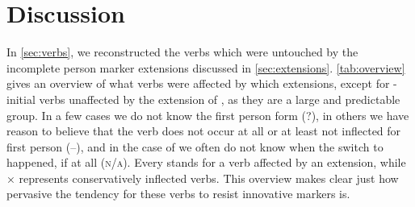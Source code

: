 \section{Discussion}
\label{sec:discussion}
In \cref{sec:verbs}, we reconstructed the verbs which were untouched by the incomplete person marker extensions discussed in \cref{sec:extensions}.
\cref{tab:overview} gives an overview of what verbs were affected by which extensions, except for -initial \akuriyo verbs unaffected by the extension of , as they are a large and predictable group.
In a few cases we do not know the first person form (?), in others we have reason to believe that the verb does not occur at all or at least not inflected for first person (–), and in the case of  we often do not know when the switch to  happened, if at all (\textsc{n/a}).
Every \checkmark stands for a verb affected by an extension, while × represents conservatively inflected verbs.
This overview makes clear just how pervasive the tendency for these verbs to resist innovative markers is.



